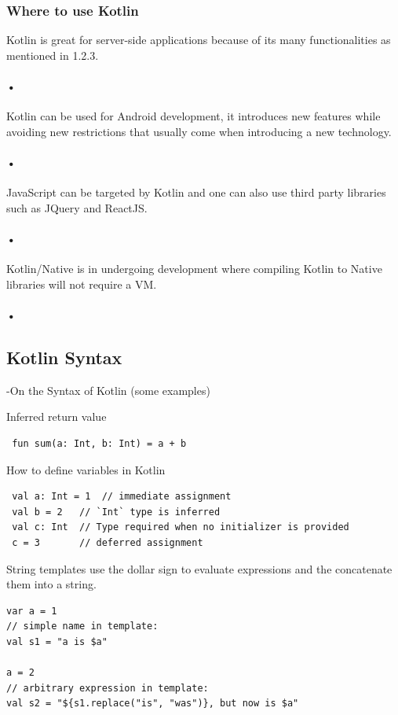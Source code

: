 \subsubsection{Where to use Kotlin}
Kotlin is great for server-side applications because of its many functionalities as mentioned in 1.2.3. \paragraph{•}
Kotlin can be used for Android development, it introduces new features while avoiding new restrictions that usually come when introducing a new technology. \paragraph{•}
JavaScript can be targeted by Kotlin and one can also use third party libraries such as JQuery and ReactJS. \paragraph{•}
Kotlin/Native is in undergoing development where compiling Kotlin to Native libraries will not require a VM. \paragraph{•}


\subsection{Kotlin Syntax}
 -On the Syntax of Kotlin (some examples)
 
 Inferred return value
 \begin{lstlisting}
 fun sum(a: Int, b: Int) = a + b
 \end{lstlisting}
 
 How to define variables in Kotlin
 \begin{lstlisting}
 val a: Int = 1  // immediate assignment
 val b = 2   // `Int` type is inferred
 val c: Int  // Type required when no initializer is provided
 c = 3       // deferred assignment
\end{lstlisting}

String templates use the dollar sign to evaluate expressions and the concatenate them into a string.
\begin{lstlisting}
var a = 1
// simple name in template:
val s1 = "a is $a" 

a = 2
// arbitrary expression in template:
val s2 = "${s1.replace("is", "was")}, but now is $a"
\end{lstlisting}
 
